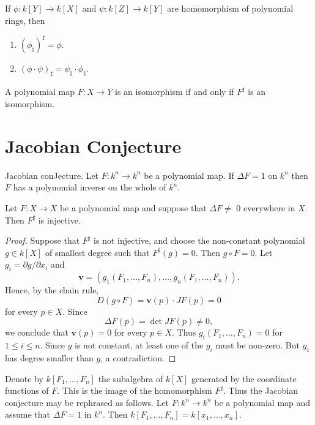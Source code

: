 \documentclass[12pt, oneside]{book}
\begin{document}
\begin{theorem}
    If $\phi: k[Y] \rightarrow k[X]$ and $\psi: k[Z] \rightarrow k[Y]$ are homomorphism of polynomial rings, then
    \begin{enumerate}
        \item
              $\left(\phi_{\sharp}\right)^{\sharp}=\phi$.
        \item
              $(\phi \cdot \psi)_{\sharp}=\psi_{\sharp} \cdot \phi_{\sharp} .$
    \end{enumerate}
\end{theorem}


\begin{corollary}
    A polynomial map $F: X \rightarrow Y$ is an isomorphism if and only if $F^{\sharp}$ is an isomorphism.
\end{corollary}

\section{Jacobian Conjecture}

Jacobian conJecture. Let $F: k^n \rightarrow k^n$ be a polynomial map. If $\Delta F=1$ on $k^n$ then $F$ has a polynomial inverse on the whole of $k^n$.

\begin{lemma}
    Let $F: X \rightarrow X$ be a polynomial map and suppose that $\Delta F \neq$ 0 everywhere in $X$. Then $F^{\sharp}$ is injective.
    \begin{proof}
        Suppose that $F^{\sharp}$ is not injective, and choose the non-constant polynomial $g \in k[X]$ of smallest degree such that $F^{\sharp}(g)=0$. Then $g\circ F=0$. Let $g_i=\partial g / \partial x_i$ and
        \begin{equation*}
            \mathbf{v}=\left(g_1\left(F_1, \ldots, F_n\right), \ldots, g_n\left(F_1, \ldots, F_n\right)\right) .
        \end{equation*}
        Hence, by the chain rule,
        \begin{equation*}
            D \left(g\circ F\right)= \mathbf{v}(p) \cdot J F(p)=0
        \end{equation*}
        for every $p \in X$. Since
        \begin{equation*}
            \Delta F(p)=\operatorname{det} J F(p) \neq 0,
        \end{equation*}
        we conclude that $\mathbf{v}(p)=0$ for every $p \in X$. Thus $g_i\left(F_1, \ldots, F_n\right)=0$ for $1 \leq i \leq n$. Since $g$ is not constant, at least one of the $g_i$ must be non-zero. But $g_1$ has degree smaller than $g$, a contradiction.
    \end{proof}
\end{lemma}
Denote by $k\left[F_1, \ldots, F_n\right]$ the subalgebra of $k[X]$ generated by the coordinate functions of $F$. This is the image of the homomorphism $F^{\sharp}$. Thus the Jacobian conjecture may be rephrased as follows.
Let $F: k^n \rightarrow k^n$ be a polynomial map and assume that $\Delta F=1$ in $k^n$. Then $k\left[F_1, \ldots, F_n\right]=k\left[x_1, \ldots, x_n\right]$.
\end{document}
